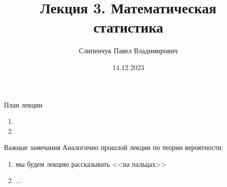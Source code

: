 
  

\title{Лекция 3. Математическая статистика}
\date{14.12.2023}
\author{Слипенчук Павел Владимирович}



  \maketitle
    
  \begin{frame}{План лекции}\label{frame:plan}
    \begin{enumerate}
    
    
    \item {}
    \item {}
	


	\end{enumerate}
 \end{frame}

\begin{frame}{Важные замечания}
Аналогично прошлой лекции по теории вероятности:
\begin{enumerate}
	\item мы будем лекцию рассказывать <<на пальцах>>
	\item ...
\end{enumerate}
\end{frame}


